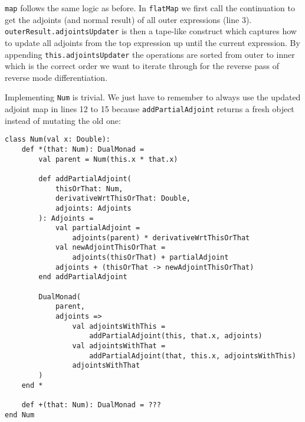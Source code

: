 \lstinline{map} follows the same logic as before. In \lstinline{flatMap} we first call the continuation to get the adjoints (and normal result) of all outer expressions (line 3). \lstinline{outerResult.adjointsUpdater} is then a tape-like construct which captures how to update all adjoints from the top expression up until the current expression. By appending \lstinline{this.adjointsUpdater} the operations are sorted from outer to inner which is the correct order we want to iterate through for the reverse pass of reverse mode differentiation. 

Implementing \lstinline{Num} is trivial. We just have to remember to always use the updated adjoint map in lines 12 to 15 because \lstinline{addPartialAdjoint} returns a fresh object instead of mutating the old one: 
\begin{lstlisting}
class Num(val x: Double):
    def *(that: Num): DualMonad =
        val parent = Num(this.x * that.x)

        def addPartialAdjoint(
            thisOrThat: Num, 
            derivativeWrtThisOrThat: Double, 
            adjoints: Adjoints
        ): Adjoints =
            val partialAdjoint = 
                adjoints(parent) * derivativeWrtThisOrThat
            val newAdjointThisOrThat = 
                adjoints(thisOrThat) + partialAdjoint
            adjoints + (thisOrThat -> newAdjointThisOrThat)
        end addPartialAdjoint

        DualMonad(
            parent,
            adjoints =>
                val adjointsWithThis = 
                    addPartialAdjoint(this, that.x, adjoints)
                val adjointsWithThat = 
                    addPartialAdjoint(that, this.x, adjointsWithThis)
                adjointsWithThat
        )
    end *

    def +(that: Num): DualMonad = ???
end Num
\end{lstlisting}

